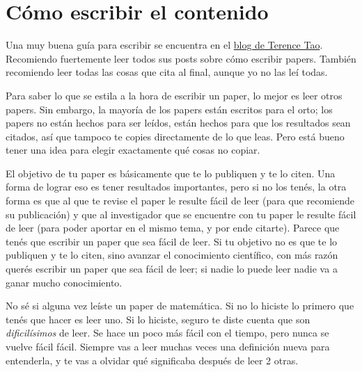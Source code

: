 \documentclass{article}
\begin{document}
\section{Cómo escribir el contenido}
Una muy buena guía para escribir se encuentra en el \href{https://terrytao.wordpress.com/advice-on-writing-papers/}{blog de Terence Tao}. Recomiendo fuertemente leer todos sus posts sobre cómo escribir papers. También recomiendo leer todas las cosas que cita al final, aunque yo no las leí todas.

Para saber lo que se estila a la hora de escribir un paper, lo mejor es leer otros papers. Sin embargo, la mayoría de los papers están escritos para el orto; los papers no están hechos para ser leídos, están hechos para que los resultados sean citados, así que tampoco te copies directamente de lo que leas.
Pero está bueno tener una idea para elegir exactamente qué cosas no copiar.

El objetivo de tu paper es básicamente que te lo publiquen y te lo citen. Una forma de lograr eso es tener resultados importantes, pero si no los tenés, la otra forma es que al que te revise el paper le resulte fácil de leer (para que recomiende su publicación) y que al investigador que se encuentre con tu paper le resulte fácil de leer (para poder aportar en el mismo tema, y por ende citarte). Parece que tenés que escribir un paper que sea fácil de leer. Si tu objetivo no es que te lo publiquen y te lo citen, sino avanzar el conocimiento científico, con más razón querés escribir un paper que sea fácil de leer; si nadie lo puede leer nadie va a ganar mucho conocimiento.

No sé si alguna vez leíste un paper de matemática. Si no lo hiciste lo primero que tenés que hacer es leer uno. Si lo hiciste, seguro te diste cuenta que son \emph{dificilísimos} de leer. Se hace un poco más fácil con el tiempo, pero nunca se vuelve fácil fácil. Siempre vas a leer muchas veces una definición nueva para entenderla, y te vas a olvidar qué significaba después de leer 2 otras.
\end{document}
